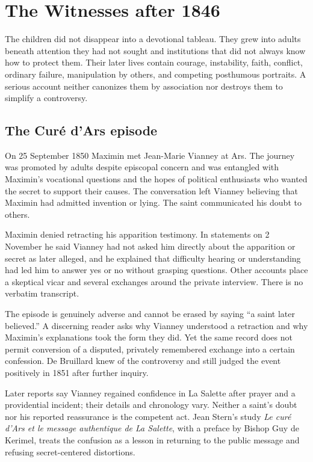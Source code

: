 \section{The Witnesses after 1846}

The children did not disappear into a devotional tableau. They grew into adults beneath attention they had not sought and institutions that did not always know how to protect them. Their later lives contain courage, instability, faith, conflict, ordinary failure, manipulation by others, and competing posthumous portraits. A serious account neither canonizes them by association nor destroys them to simplify a controversy.

\subsection{The Curé d'Ars episode}

On 25 September 1850 Maximin met Jean-Marie Vianney at Ars. The journey was promoted by adults despite episcopal concern and was entangled with Maximin's vocational questions and the hopes of political enthusiasts who wanted the secret to support their causes. The conversation left Vianney believing that Maximin had admitted invention or lying. The saint communicated his doubt to others.

Maximin denied retracting his apparition testimony. In statements on 2 November he said Vianney had not asked him directly about the apparition or secret as later alleged, and he explained that difficulty hearing or understanding had led him to answer yes or no without grasping questions. Other accounts place a skeptical vicar and several exchanges around the private interview. There is no verbatim transcript.

The episode is genuinely adverse and cannot be erased by saying ``a saint later believed.'' A discerning reader asks why Vianney understood a retraction and why Maximin's explanations took the form they did. Yet the same record does not permit conversion of a disputed, privately remembered exchange into a certain confession. De Bruillard knew of the controversy and still judged the event positively in 1851 after further inquiry.

Later reports say Vianney regained confidence in La Salette after prayer and a providential incident; their details and chronology vary. Neither a saint's doubt nor his reported reassurance is the competent act. Jean Stern's study \emph{Le curé d'Ars et le message authentique de La Salette}, with a preface by Bishop Guy de Kerimel, treats the confusion as a lesson in returning to the public message and refusing secret-centered distortions.

